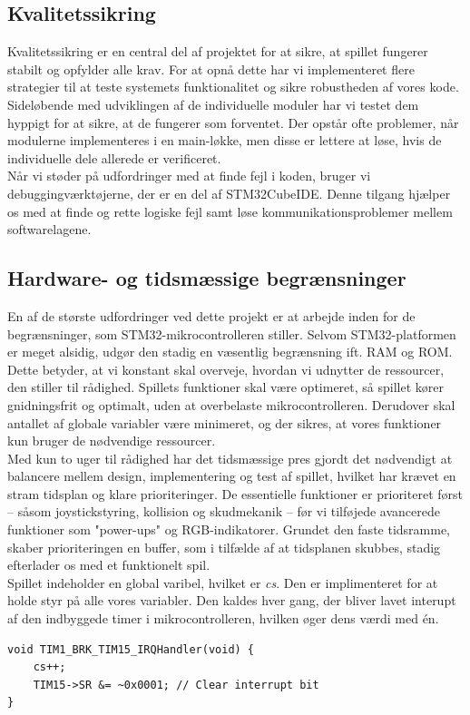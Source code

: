 \subsection{Kvalitetssikring}
Kvalitetssikring er en central del af projektet for at sikre, at spillet fungerer stabilt og opfylder alle krav. For at opnå dette har vi implementeret flere strategier til at teste systemets funktionalitet og sikre robustheden af vores kode.\\
Sideløbende med udviklingen af de individuelle moduler har vi testet dem hyppigt for at sikre, at de fungerer som forventet. Der opstår ofte problemer, når modulerne implementeres i en main-løkke, men disse er lettere at løse, hvis de individuelle dele allerede er verificeret.\\
Når vi støder på udfordringer med at finde fejl i koden, bruger vi debuggingværktøjerne, der er en del af STM32CubeIDE. Denne tilgang hjælper os med at finde og rette logiske fejl samt løse kommunikationsproblemer mellem softwarelagene.

\subsection{Hardware- og tidsmæssige begrænsninger}
En af de største udfordringer ved dette projekt er at arbejde inden for de begrænsninger, som STM32-mikrocontrolleren stiller. Selvom STM32-platformen er meget alsidig, udgør den stadig en væsentlig begrænsning ift. RAM og ROM. Dette betyder, at vi konstant skal overveje, hvordan vi udnytter de ressourcer, den stiller til rådighed.
Spillets funktioner skal være optimeret, så spillet kører gnidningsfrit og optimalt, uden at overbelaste mikrocontrolleren. Derudover skal antallet af globale variabler være minimeret, og der sikres, at vores funktioner kun bruger de nødvendige ressourcer.\\
Med kun to uger til rådighed har det tidsmæssige pres gjordt det nødvendigt at balancere mellem design, implementering og test af spillet, hvilket har krævet en stram tidsplan og klare prioriteringer. De essentielle funktioner er prioriteret først – såsom joystickstyring, kollision og skudmekanik – før vi tilføjede avancerede funktioner som "power-ups" og RGB-indikatorer. Grundet den faste tidsramme, skaber prioriteringen en buffer, som i tilfælde af at tidsplanen skubbes, stadig efterlader os med et funktionelt spil.\\

Spillet indeholder en global varibel, hvilket er \textit{cs}. Den er implimenteret for at holde styr på alle vores variabler. Den kaldes hver gang, der bliver lavet interupt af den indbyggede timer i mikrocontrolleren, hvilken øger dens værdi med én.
\begin{lstlisting}[caption={Timer kode}]
void TIM1_BRK_TIM15_IRQHandler(void) {
    cs++;
    TIM15->SR &= ~0x0001; // Clear interrupt bit
}
\end{lstlisting}



